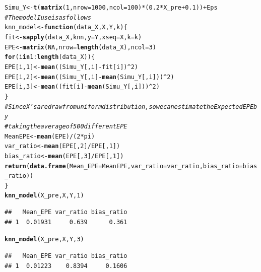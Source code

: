 \documentclass{article}\usepackage[]{graphicx}\usepackage[]{color}
\makeatletter
\newcommand{\hlnum}[1]{\textcolor[rgb]{0.686,0.059,0.569}{#1}}%
\newcommand{\hlcom}[1]{\textcolor[rgb]{0.678,0.584,0.686}{\textit{#1}}}%
\newcommand{\hlopt}[1]{\textcolor[rgb]{0,0,0}{#1}}%
\newcommand{\hlstd}[1]{\textcolor[rgb]{0.345,0.345,0.345}{#1}}%
\newcommand{\hlkwa}[1]{\textcolor[rgb]{0.161,0.373,0.58}{\textbf{#1}}}%
\newcommand{\hlkwb}[1]{\textcolor[rgb]{0.69,0.353,0.396}{#1}}%
\newcommand{\hlkwc}[1]{\textcolor[rgb]{0.333,0.667,0.333}{#1}}%
\newcommand{\hlkwd}[1]{\textcolor[rgb]{0.737,0.353,0.396}{\textbf{#1}}}%
\newenvironment{kframe}{%
 \def\at@end@of@kframe{}%
 \ifinner\ifhmode%
  \def\at@end@of@kframe{\end{minipage}}%
  \begin{minipage}{\columnwidth}%
 \fi\fi%
 \def\FrameCommand##1{\hskip\@totalleftmargin \hskip-\fboxsep
 \colorbox{shadecolor}{##1}\hskip-\fboxsep
     \hskip-\linewidth \hskip-\@totalleftmargin \hskip\columnwidth}%
 \MakeFramed {\advance\hsize-\width
   \@totalleftmargin\z@ \linewidth\hsize
   \@setminipage}}%
 {\par\unskip\endMakeFramed%
 \at@end@of@kframe}
\newenvironment{knitrout}{}{} %
\makeatother
\begin{document}
\begin{knitrout}
\begin{kframe}
\begin{alltt}
\hlstd{Simu_Y} \hlkwb{<-} \hlkwd{t}\hlstd{(}\hlkwd{matrix}\hlstd{(}\hlnum{1}\hlstd{,} \hlkwc{nrow} \hlstd{=} \hlnum{1000}\hlstd{,} \hlkwc{ncol} \hlstd{=} \hlnum{100}\hlstd{)} \hlopt{*} \hlstd{(}\hlnum{0.2} \hlopt{*} \hlstd{X_pre} \hlopt{+} \hlnum{0.1}\hlstd{))} \hlopt{+} \hlstd{Eps}
\hlcom{# The model I use is as follows}
\hlstd{knn_model} \hlkwb{<-} \hlkwa{function}\hlstd{(}\hlkwc{data_X}\hlstd{,} \hlkwc{X}\hlstd{,} \hlkwc{Y}\hlstd{,} \hlkwc{k}\hlstd{) \{}
    \hlstd{fit} \hlkwb{<-} \hlkwd{sapply}\hlstd{(data_X, knn,} \hlkwc{y} \hlstd{= Y,} \hlkwc{xseq} \hlstd{= X,} \hlkwc{k} \hlstd{= k)}
    \hlstd{EPE} \hlkwb{<-} \hlkwd{matrix}\hlstd{(}\hlnum{NA}\hlstd{,} \hlkwc{nrow} \hlstd{=} \hlkwd{length}\hlstd{(data_X),} \hlkwc{ncol} \hlstd{=} \hlnum{3}\hlstd{)}
    \hlkwa{for} \hlstd{(i} \hlkwa{in} \hlnum{1}\hlopt{:}\hlkwd{length}\hlstd{(data_X)) \{}
        \hlstd{EPE[i,} \hlnum{1}\hlstd{]} \hlkwb{<-} \hlkwd{mean}\hlstd{((Simu_Y[, i]} \hlopt{-} \hlstd{fit[i])}\hlopt{^}\hlnum{2}\hlstd{)}
        \hlstd{EPE[i,} \hlnum{2}\hlstd{]} \hlkwb{<-} \hlkwd{mean}\hlstd{((Simu_Y[, i]} \hlopt{-} \hlkwd{mean}\hlstd{(Simu_Y[, i]))}\hlopt{^}\hlnum{2}\hlstd{)}
        \hlstd{EPE[i,} \hlnum{3}\hlstd{]} \hlkwb{<-} \hlkwd{mean}\hlstd{((fit[i]} \hlopt{-} \hlkwd{mean}\hlstd{(Simu_Y[, i]))}\hlopt{^}\hlnum{2}\hlstd{)}
    \hlstd{\}}
    \hlcom{# Since X's are draw from uniform distribution, so we can estimate the Expected EPE by}
    \hlcom{# taking the average of 500 different EPE}
    \hlstd{MeanEPE} \hlkwb{<-} \hlkwd{mean}\hlstd{(EPE)}\hlopt{/}\hlstd{(}\hlnum{2} \hlopt{*} \hlstd{pi)}
    \hlstd{var_ratio} \hlkwb{<-} \hlkwd{mean}\hlstd{(EPE[,} \hlnum{2}\hlstd{]}\hlopt{/}\hlstd{EPE[,} \hlnum{1}\hlstd{])}
    \hlstd{bias_ratio} \hlkwb{<-} \hlkwd{mean}\hlstd{(EPE[,} \hlnum{3}\hlstd{]}\hlopt{/}\hlstd{EPE[,} \hlnum{1}\hlstd{])}
    \hlkwd{return}\hlstd{(}\hlkwd{data.frame}\hlstd{(}\hlkwc{Mean_EPE} \hlstd{= MeanEPE,} \hlkwc{var_ratio} \hlstd{= var_ratio,} \hlkwc{bias_ratio} \hlstd{= bias_ratio))}
\hlstd{\}}
\hlkwd{knn_model}\hlstd{(X_pre, X, Y,} \hlnum{1}\hlstd{)}
\end{alltt}
\begin{verbatim}
##   Mean_EPE var_ratio bias_ratio
## 1  0.01931     0.639      0.361
\end{verbatim}
\begin{alltt}
\hlkwd{knn_model}\hlstd{(X_pre, X, Y,} \hlnum{3}\hlstd{)}
\end{alltt}
\begin{verbatim}
##   Mean_EPE var_ratio bias_ratio
## 1  0.01223    0.8394     0.1606
\end{verbatim}

\end{kframe}
\end{knitrout}
\end{document}
